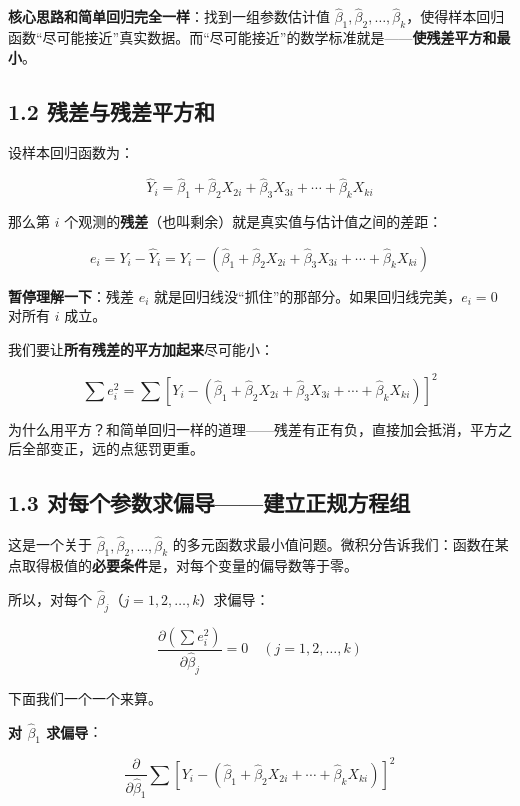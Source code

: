 \documentclass[12pt,a4paper]{ctexart}
\begin{document}
\textbf{核心思路和简单回归完全一样}：找到一组参数估计值 $\hat{\beta}_1, \hat{\beta}_2, \ldots, \hat{\beta}_k$，使得样本回归函数“尽可能接近”真实数据。而“尽可能接近”的数学标准就是——\textbf{使残差平方和最小}。

\subsection{1.2 残差与残差平方和}

设样本回归函数为：

\[
\hat{Y}_i = \hat{\beta}_1 + \hat{\beta}_2 X_{2i} + \hat{\beta}_3 X_{3i} + \cdots + \hat{\beta}_k X_{ki}
\]

那么第 $i$ 个观测的\textbf{残差}（也叫剩余）就是真实值与估计值之间的差距：

\begin{equation}
e_i = Y_i - \hat{Y}_i = Y_i - (\hat{\beta}_1 + \hat{\beta}_2 X_{2i} + \hat{\beta}_3 X_{3i} + \cdots + \hat{\beta}_k X_{ki}) \tag{3.22}
\end{equation}

\textbf{暂停理解一下}：残差 $e_i$ 就是回归线没“抓住”的那部分。如果回归线完美，$e_i = 0$ 对所有 $i$ 成立。

我们要让\textbf{所有残差的平方加起来}尽可能小：

\[
\sum e_i^2 = \sum [Y_i - (\hat{\beta}_1 + \hat{\beta}_2 X_{2i} + \hat{\beta}_3 X_{3i} + \cdots + \hat{\beta}_k X_{ki})]^2
\]

为什么用平方？和简单回归一样的道理——残差有正有负，直接加会抵消，平方之后全部变正，远的点惩罚更重。

\subsection{1.3 对每个参数求偏导——建立正规方程组}

这是一个关于 $\hat{\beta}_1, \hat{\beta}_2, \ldots, \hat{\beta}_k$ 的多元函数求最小值问题。微积分告诉我们：函数在某点取得极值的\textbf{必要条件}是，对每个变量的偏导数等于零。

所以，对每个 $\hat{\beta}_j$（$j = 1, 2, \ldots, k$）求偏导：

\[
\frac{\partial(\sum e_i^2)}{\partial \hat{\beta}_j} = 0 \quad (j = 1, 2, \ldots, k)
\]

下面我们一个一个来算。

\textbf{对 $\hat{\beta}_1$ 求偏导}：

\[
\frac{\partial}{\partial \hat{\beta}_1} \sum [Y_i - (\hat{\beta}_1 + \hat{\beta}_2 X_{2i} + \cdots + \hat{\beta}_k X_{ki})]^2
\]
\end{document}

